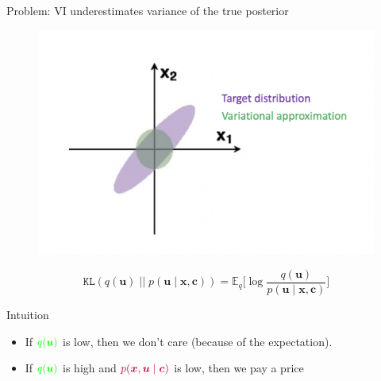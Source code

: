 \documentclass[10pt]{beamer}
\newcommand{\df}{\displaystyle\frac}
\newcommand{\+}[1]{\ensuremath{{\boldsymbol #1}}} %
\newcommand{\cond}{\; | \;}
\newcommand{\green}[1]{\color{green}{#1}  \color{black}}
\newcommand{\purple}[1]{\color{purple}{#1}  \color{black}}
\newcommand{\E}{\mathbb{E}}
\begin{document}
\begin{frame}{Problem: VI underestimates variance of the true posterior}


	\begin{figure}
	\includegraphics[width=.7\textwidth]{images/underfit_variance_2.png}
	\end{figure}


\[ \texttt{KL} (q(\+u) \; || \; p(\+u \cond \+x, \+c)) =  \E_q \bigg[\log \df{q(\+u )}{p(\+u \cond \+x, \+c)} \bigg]  \]
 
Intuition 
\begin{itemize}

\item If $ \green{q(\+u )}$ is low, then we don't care (because of the expectation).   
\item If $ \green{q(\+u )}$ is high and $ \purple{p(\+x,\+u \cond \+c)}$  is low, then we pay a price
\end{itemize}

\end{frame}




%
%
%
\end{document}
